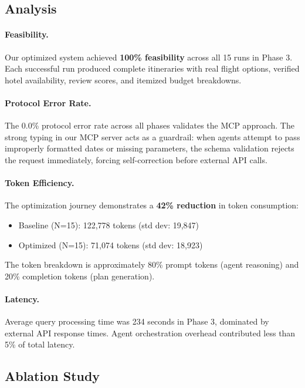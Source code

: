 \documentclass[10pt,twocolumn]{article}
\begin{document}
\subsection{Analysis}

\paragraph{Feasibility.}
Our optimized system achieved \textbf{100\% feasibility} across all 15 runs in Phase 3. Each successful run produced complete itineraries with real flight options, verified hotel availability, review scores, and itemized budget breakdowns.

\paragraph{Protocol Error Rate.}
The 0.0\% protocol error rate across all phases validates the MCP approach. The strong typing in our MCP server acts as a guardrail: when agents attempt to pass improperly formatted dates or missing parameters, the schema validation rejects the request immediately, forcing self-correction before external API calls.

\paragraph{Token Efficiency.}
The optimization journey demonstrates a \textbf{42\% reduction} in token consumption:
\begin{itemize}
    \item Baseline (N=15): 122,778 tokens (std dev: 19,847)
    \item Optimized (N=15): 71,074 tokens (std dev: 18,923)
\end{itemize}
The token breakdown is approximately 80\% prompt tokens (agent reasoning) and 20\% completion tokens (plan generation).

\paragraph{Latency.}
Average query processing time was 234 seconds in Phase 3, dominated by external API response times. Agent orchestration overhead contributed less than 5\% of total latency.

\subsection{Ablation Study}
\end{document}
